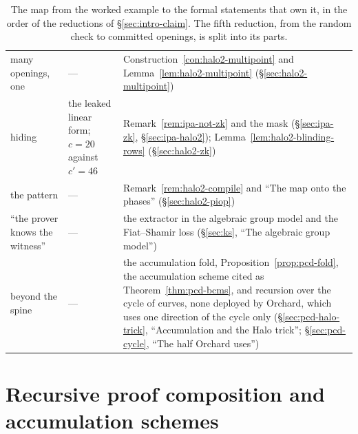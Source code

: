 \documentclass[11pt,a4paper]{article}
\theoremstyle{definition}
\begin{document}
\begin{table}[htbp]
\begin{tabular}{@{}p{3.0cm} p{4.0cm} p{6.0cm}@{}}
\quad many openings, one & --- & Construction~\ref{con:halo2-multipoint}
  and Lemma~\ref{lem:halo2-multipoint} (\S\ref{sec:halo2-multipoint}) \\
\quad hiding & the leaked linear form; $c = 20$ against $c' = 46$
  & Remark~\ref{rem:ipa-not-zk} and the mask (\S\ref{sec:ipa-zk},
  \S\ref{sec:ipa-halo2});
  Lemma~\ref{lem:halo2-blinding-rows} (\S\ref{sec:halo2-zk}) \\
\quad the pattern & ---
  & Remark~\ref{rem:halo2-compile} and ``The map onto the phases''
  (\S\ref{sec:halo2-piop}) \\
\addlinespace
``the prover knows the witness'' & --- & the extractor in the algebraic group
  model and the Fiat--Shamir loss (\S\ref{sec:ks}, ``The algebraic
  group model'') \\
beyond the spine & --- & the accumulation fold,
  Proposition~\ref{prop:pcd-fold}, the accumulation scheme cited as
  Theorem~\ref{thm:pcd-bcms}, and recursion over the cycle of curves,
  none deployed by Orchard, which uses one direction of the cycle only
  (\S\ref{sec:pcd-halo-trick}, ``Accumulation and the Halo trick'';
  \S\ref{sec:pcd-cycle}, ``The half Orchard uses'') \\
\bottomrule
\end{tabular}
\caption{The map from the worked example to the formal statements that
own it, in the order of the reductions of \S\ref{sec:intro-claim}. The
fifth reduction, from the random check to committed openings, is split
into its parts.}
\label{tab:verdict-map}
\end{table}


\section{Recursive proof composition and accumulation schemes}
\label{sec:pcd}
\end{document}
